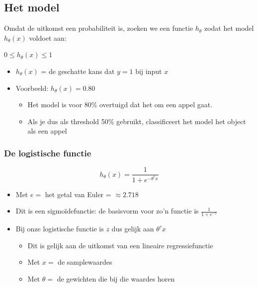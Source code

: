\documentclass{article}
\begin{document}
\subsection{Het model}

Omdat de uitkomst een probabiliteit is, zoeken we een functie $h_{\theta}$ zodat het model $h_{\theta}(x)$ voldoet aan:

\begin{center}
$0 \leq h_{\theta}(x) \leq 1$
\end{center}

\begin{itemize}
    \item $h_{\theta}(x)$ = de geschatte kans dat $y=1$ bij input $x$
    \item Voorbeeld: $h_{\theta}(x) = 0.80$
    \begin{itemize}
        \item Het model is voor 80\% overtuigd dat het om een appel gaat.
        \item Als je dus als threshold 50\% gebruikt, classificeert het model het object als een appel
    \end{itemize}
\end{itemize}

\subsubsection{De logistische functie}

\begin{equation}
h_{\theta}(x) = \frac{1}{1 + e^{-\theta^{\tau}x}}
\end{equation}

\begin{itemize}
    \item Met $e =$ het getal van Euler = $\approx 2.718$
    \item Dit is een sigmoïdefunctie: de basisvorm voor zo'n functie is $\frac{1}{1+e^{-z}}$
    \item Bij onze logistische functie is $z$ dus gelijk aan $\theta^{\tau}x$
    \begin{itemize}
        \item Dit is gelijk aan de uitkomst van een lineaire regressiefunctie
        \item Met $x =$ de samplewaardes
        \item Met $\theta =$ de gewichten die bij die waardes horen 
    \end{itemize}
\end{itemize}
\end{document}
